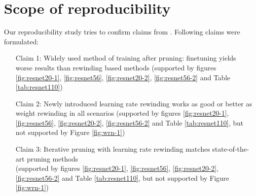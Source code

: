 
\section{Scope of reproducibility}
\label{sec:claims}



Our reproducibility study tries to confirm claims from \cite{Renda}.
Following claims were formulated:
\begin{itemize}
    \item [Claim 1:] Widely used method of training after pruning: finetuning yields worse results than rewinding based methods (supported by figures \ref{fig:resnet20-1}, \ref{fig:resnet56}, \ref{fig:resnet20-2}, \ref{fig:resnet56-2} and Table \ref{tab:resnet110})
    \item [Claim 2:] Newly introduced learning rate rewinding works as good or better as weight rewinding in all scenarios (supported by figures \ref{fig:resnet20-1}, \ref{fig:resnet56}, \ref{fig:resnet20-2}, \ref{fig:resnet56-2} and Table \ref{tab:resnet110}, but not supported by Figure \ref{fig:wrn-1})
    \item [Claim 3:] Iterative pruning with learning rate rewinding matches state-of-the-art pruning methods \\(supported by figures \ref{fig:resnet20-1}, \ref{fig:resnet56}, \ref{fig:resnet20-2}, \ref{fig:resnet56-2} and Table \ref{tab:resnet110}, but not supported by Figure \ref{fig:wrn-1})
\end{itemize}

